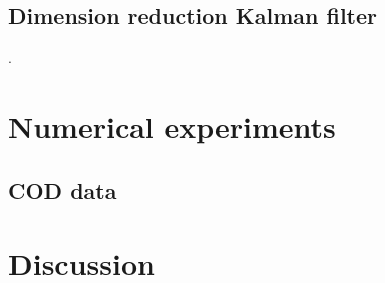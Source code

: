 \documentclass[a4paper,12pt]{article}
\begin{document}
\subsection{Dimension reduction Kalman filter}
\cite{solonen}.

\section{Numerical experiments}

\subsection{COD data}


\section{Discussion}




\end{document}
